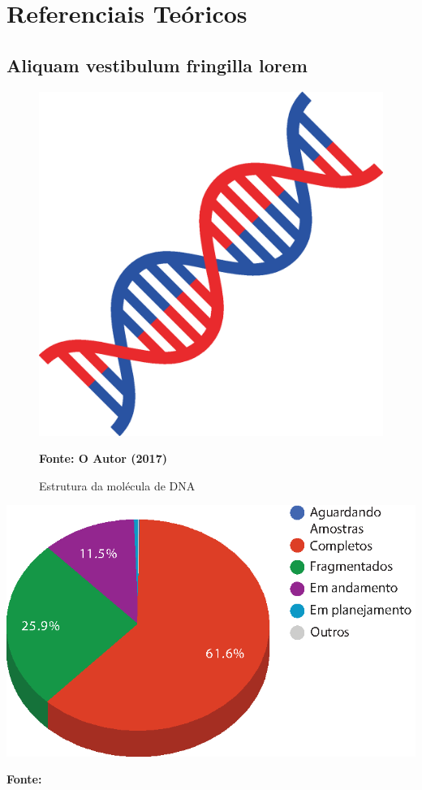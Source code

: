 \documentclass[
	12pt,				%
	openright,			%
	oneside,			%
	a4paper,			%
	chapter=TITLE,		%
	english,			%
	french,				%
	spanish,			%
	brazil				%
	]{abntex2}
\theoremstyle{definition}
\begin{document}


\chapter{Referenciais Teóricos}
\label{cap:referenciais_teoricos}

\section{Aliquam vestibulum fringilla lorem}

\begin{figure}[!htb]
	\caption{Estrutura da molécula de DNA}
	\label{fig:estrutura_dna}
	\centering
	\includegraphics[width=.3\textwidth]{estrutura_dna.eps} \\
	\begin{small}\textbf{Fonte: O Autor (2017)}\end{small}
\end{figure}

\lipsum[1]

\begin{grafico}[!htb]
	\caption{Estado do sequenciamento de genomas bacterianos}
	\label{grafico:gold_bacterial_sequencing_status}
	\centering
	\includegraphics[width=.6\textwidth]{gold_bacterial_sequencing_status.eps} \\
	\begin{small}\textbf{Fonte: }\end{small}
\end{grafico}
\end{document}

